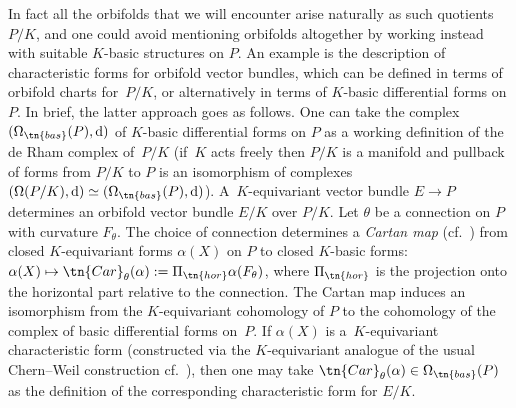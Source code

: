 In fact all the orbifolds that we will encounter arise naturally as such quotients $P/K$, and one could avoid mentioning orbifolds altogether by working instead with suitable $K$-basic structures on $P$. An example is the description of characteristic forms for orbifold vector bundles, which can be defined in terms of orbifold charts for~$P/K$, or alternatively in terms of $K$-basic differential forms on $P$. In brief, the latter approach goes as follows. One can take the complex $(\Omega_{\tn{bas}}(P),{\rm d})$ of $K$-basic differential forms on $P$ as a working definition of the de Rham complex of~$P/K$ (if~$K$ acts freely then $P/K$ is a manifold and pullback of forms from $P/K$ to $P$ is an isomorphism of complexes $(\Omega(P/K),{\rm d})\simeq (\Omega_{\tn{bas}}(P),{\rm d})$). A~$K$-equivariant vector bundle $E \rightarrow P$ determines an orbifold vector bundle $E/K$ over $P/K$. Let $\theta$ be a connection on $P$ with curvature $F_\theta$. The choice of connection determines a \emph{Cartan map} (cf.~\cite{MeinrenkenEncyclopedia}) from closed $K$-equivariant forms $\alpha(X)$ on $P$ to closed $K$-basic forms: $\alpha(X) \mapsto \tn{Car}_\theta(\alpha):=\Pi_{\tn{hor}}\alpha(F_\theta)$, where $\Pi_{\tn{hor}}$ is the projection onto the horizontal part relative to the connection. The Cartan map induces an isomorphism from the $K$-equivariant cohomology of $P$ to the cohomology of the complex of basic differential forms on~$P$. If $\alpha(X)$ is a~$K$-equivariant characteristic form (constructed via the $K$-equivariant analogue of the usual Chern--Weil construction cf.~\cite{BerlineGetzlerVergne,MeinrenkenEncyclopedia}), then one may take $\tn{Car}_\theta(\alpha) \in \Omega_{\tn{bas}}(P)$ as the definition of the corresponding characteristic form for $E/K$.

